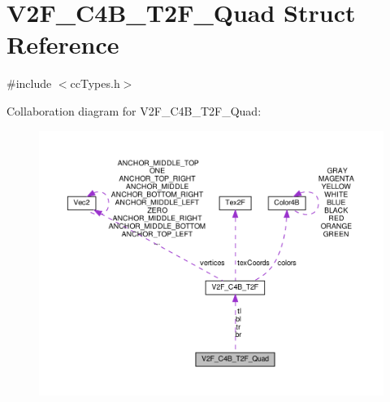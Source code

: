 \hypertarget{structV2F__C4B__T2F__Quad}{}\section{V2\+F\+\_\+\+C4\+B\+\_\+\+T2\+F\+\_\+\+Quad Struct Reference}
\label{structV2F__C4B__T2F__Quad}


{\ttfamily \#include $<$cc\+Types.\+h$>$}



Collaboration diagram for V2\+F\+\_\+\+C4\+B\+\_\+\+T2\+F\+\_\+\+Quad\+:
\nopagebreak
\begin{figure}[H]
\begin{center}
\leavevmode
\includegraphics[width=350pt]{structV2F__C4B__T2F__Quad__coll__graph}
\end{center}
\end{figure}
